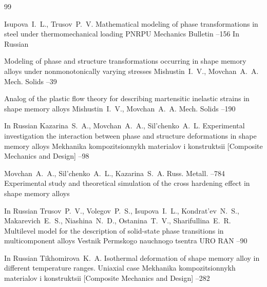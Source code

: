 \begin{thebibliography}{99}

\by Isupova~I.~L., Trusov~P.~V.
\paper Mathematical modeling of phase transformations in steel under thermomechanical loading
\jour PNRPU Mechanics Bulletin
--156
\lang In Russian


\paper Modeling of phase and structure transformations occurring in shape memory alloys under nonmonotonically varying stresses
\by Mishustin~I.~V., Movchan~A.~A.
\jour Mech. Solids
--39


\paper Analog of the plastic flow theory for describing martensitic inelastic strains in shape memory alloys
\by Mishustin~I.~V., Movchan~A.~A.
\jour Mech. Solids
--190


\lang In Russian
\by Kazarina~S.~A.,     Movchan~A.~A.,     Sil'chenko~A.~L.     
\paper Experimental  investigation  the  interaction  between  phase  and   structure   deformations   in   shape   memory   alloys
\jour Mekhanika kompozitsionnykh     materialov     i     konstruktsii     \rm [Composite     
Mechanics and Design]
--98


\by Movchan~A.~A.,  Sil'chenko~A.~L.,  Kazarina~S.~A.
\jour Russ. Metall. 
–784 
\paper Experimental study and theoretical simulation of the cross hardening effect in shape memory alloys



\lang In Russian
\by Trusov~P.~V., Volegov~P.~S., Isupova~I.~L., Kondrat'ev~N.~S., Makarevich~E.~S., Niashina~N.~D., Ostanina~T.~V., Sharifullina~E.~R.
\paper Multilevel model for the description of solid-state phase transitions in multicomponent alloys
\jour Vestnik Permskogo nauchnogo tsentra URO RAN
--90


\lang In Russian
\by Tikhomirova~K.~A. 
\paper Isothermal deformation of shape memory  alloy  in  different  temperature  ranges.  Uniaxial  case
\jour Mekhanika  kompozitsionnykh  materialov  i  konstruktsii  \rm [Composite  Mechanics   and Design]
--282


\end{thebibliography}
